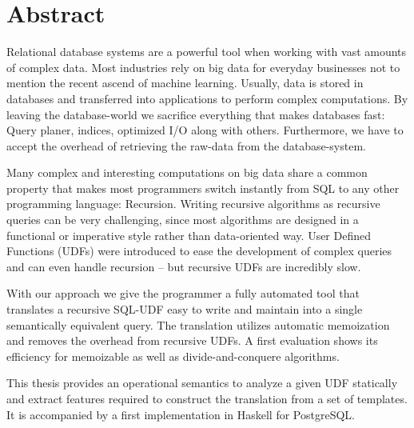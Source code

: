 \section*{Abstract}
Relational database systems are a powerful tool when working with vast amounts of complex data. Most industries rely on big data for everyday businesses not to mention the recent ascend of machine learning. Usually, data is stored in databases and transferred into applications to perform complex computations. By leaving the database-world we sacrifice everything that makes databases fast: Query planer, indices, optimized I/O along with others. Furthermore, we have to accept the overhead of retrieving the raw-data from the database-system.

Many complex and interesting computations on big data share a common property that makes most programmers switch instantly from SQL to any other programming language: Recursion. Writing recursive algorithms as recursive queries can be very challenging, since most algorithms are designed in a functional or imperative style rather than data-oriented way. User Defined Functions (UDFs) were introduced to ease the development of complex queries and can even handle recursion -- but recursive UDFs are incredibly slow.

With our approach we give the programmer a fully automated tool that translates a recursive SQL-UDF easy to write and maintain into a single semantically equivalent query. The translation utilizes automatic memoization and removes the overhead from recursive UDFs. A first evaluation shows its efficiency for memoizable as well as divide-and-conquere algorithms. 

This thesis provides an operational semantics to analyze a given UDF statically and extract features required to construct the translation from a set of templates. It is accompanied by a first implementation in Haskell for PostgreSQL.
